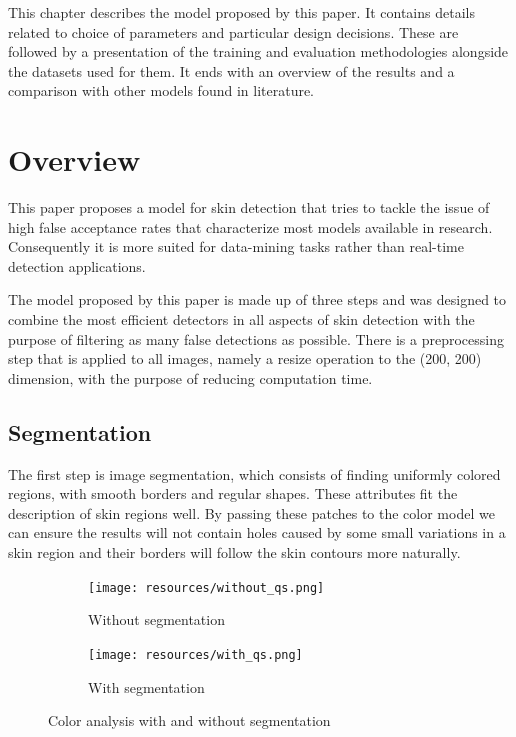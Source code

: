\documentclass[12pt]{report}
\begin{document}
	This chapter describes the model proposed by this paper. It contains details related to choice of parameters and particular design decisions. These are followed by a presentation of the training and evaluation methodologies alongside the datasets used for them. It ends with an overview of the results and a comparison with other models found in literature.
	
	\section{Overview}
	This paper proposes a model for skin detection that tries to tackle the issue of high false acceptance rates that characterize most models available in research. Consequently it is more suited for data-mining tasks rather than real-time detection applications.
	
	The model proposed by this paper is made up of three steps and was designed to combine the most efficient detectors in all aspects of skin detection with the purpose of filtering as many false detections as possible. There is a preprocessing step that is applied to all images, namely a resize operation to the (200, 200) dimension, with the purpose of reducing computation time.
	
	\subsection{Segmentation}
	The first step is image segmentation, which consists of finding uniformly colored regions, with smooth borders and regular shapes. These attributes fit the description of skin regions well. By passing these patches to the color model we can ensure the results will not contain holes caused by some small variations in a skin region and their borders will follow the skin contours more naturally.
	
	\begin{figure}[h!]
		\centering
		\begin{subfigure}[b]{0.3\linewidth}
			\texttt{[image: resources/without\_qs.png]}
			\caption{Without segmentation}
		\end{subfigure}
		\begin{subfigure}[b]{0.3\linewidth}
			\texttt{[image: resources/with\_qs.png]}
			\caption{With segmentation}
		\end{subfigure}
		\caption{Color analysis with and without segmentation}
		\label{fig:segmentation_use}
	\end{figure}
	
\end{document}
